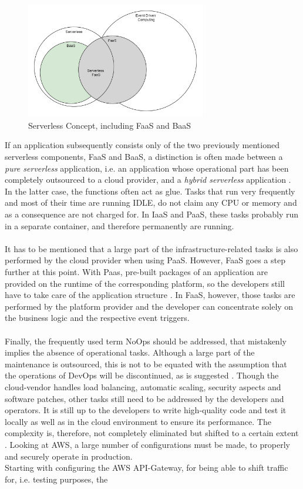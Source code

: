\documentclass[11pt]{article}
\begin{document}
\begin{figure}[H]
\caption{Serverless Concept, including FaaS and BaaS}
\label{fig:serverlessBaaSandPaas}
\centering
\includegraphics[width=0.7\textwidth]{Serverless}
\end{figure} 
If an application subsequently consists only of the two previously mentioned serverless components, FaaS and BaaS, a distinction is often made between a \textit{pure serverless} application, i.e. an application whose operational part has been completely outsourced to a cloud provider, and a \textit{hybrid serverless} application \cite{leitner2019mixed}. In the latter case, the functions often act as glue. Tasks that run very frequently and most of their time are running IDLE, do not claim any CPU or memory and as a consequence are not charged for. In IaaS and PaaS, these tasks probably run in a separate container, and therefore permanently are running.\\\\ It has to be mentioned that a large part of the infrastructure-related tasks is also performed by the cloud provider when using PaaS. However, FaaS goes a step further at this point. With Paas, pre-built packages of an application are provided on the runtime of the corresponding platform, so the developers still have to take care of the application structure \cite{kaplan2019framework}. In FaaS, however, those tasks are performed by the platform provider and the developer can concentrate solely on the business logic and the respective event triggers.\\\\ Finally, the frequently used term \glqq NoOps\grqq{} \cite{fowler2018serverless} should be addressed, that mistakenly implies the absence of operational tasks. Although a large part of the maintenance is outsourced, this is not to be equated with the assumption that the operations of DevOps will be discontinued, as is suggested \cite{fowler2018serverless}.  Though the cloud-vendor handles load balancing, automatic scaling, security aspects and software patches, other tasks still need to be addressed by the developers and operators. It is still up to the developers to write high-quality code and test it locally as well as in the cloud environment to ensure its performance. The complexity is, therefore, not completely eliminated but shifted to a certain extent \cite{eivy2017wary}. Looking at AWS, a large number of configurations must be made, to properly and securely operate in production.\\ Starting with configuring the AWS API-Gateway, for being able to shift traffic for, i.e. testing purposes, the 
\end{document}
